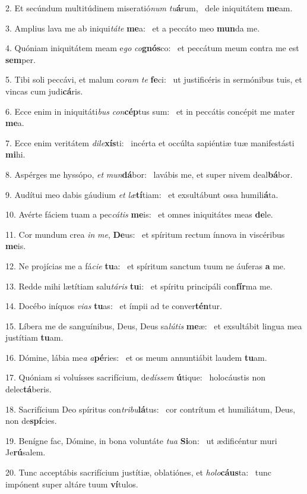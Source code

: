 2. Et secúndum multitúdinem miseratió\textit{num} \textit{tu}\textbf{á}rum, \ast\  dele iniquitátem \textbf{me}am.\

3. Amplius lava me ab iniqui\textit{tá}\textit{te} \textbf{me}a: \ast\  et a peccáto meo \textbf{mun}da me.\

4. Quóniam iniquitátem meam e\textit{go} \textit{co}\textbf{gnós}co: \ast\  et peccátum meum contra me est \textbf{sem}per.\

5. Tibi soli peccávi, et malum co\textit{ram} \textit{te} \textbf{fe}ci: \ast\  ut justificéris in sermónibus tuis, et vincas cum judi\textbf{cá}ris.\

6. Ecce enim in iniquitáti\textit{bus} \textit{con}\textbf{cép}tus sum: \ast\  et in peccátis concépit me mater \textbf{me}a.\

7. Ecce enim veritátem \textit{di}\textit{le}\textbf{xís}ti: \ast\  incérta et occúlta sapiéntiæ tuæ manifestásti \textbf{mi}hi.\

8. Aspérges me hyssópo, \textit{et} \textit{mun}\textbf{dá}bor: \ast\  lavábis me, et super nivem deal\textbf{bá}bor.\

9. Audítui meo dabis gáudium \textit{et} \textit{læ}\textbf{tí}tiam: \ast\  et exsultábunt ossa humili\textbf{á}ta.\

10. Avérte fáciem tuam a pec\textit{cá}\textit{tis} \textbf{me}is: \ast\  et omnes iniquitátes meas \textbf{de}le.\

11. Cor mundum crea \textit{in} \textit{me}, \textbf{De}us: \ast\  et spíritum rectum ínnova in viscéribus \textbf{me}is.\

12. Ne projícias me a fá\textit{ci}\textit{e} \textbf{tu}a: \ast\  et spíritum sanctum tuum ne áuferas \textbf{a} me.\

13. Redde mihi lætítiam salu\textit{tá}\textit{ris} \textbf{tu}i: \ast\  et spíritu principáli con\textbf{fír}ma me.\

14. Docébo iníquos \textit{vi}\textit{as} \textbf{tu}as: \ast\  et ímpii ad te conver\textbf{tén}tur.\

15. Líbera me de sanguínibus, Deus, Deus sa\textit{lú}\textit{tis} \textbf{me}æ: \ast\  et exsultábit lingua mea justítiam \textbf{tu}am.\

16. Dómine, lábia me\textit{a} \textit{a}\textbf{pé}ries: \ast\  et os meum annuntiábit laudem \textbf{tu}am.\

17. Quóniam si voluísses sacrifícium, de\textit{dís}\textit{sem} \textbf{ú}tique: \ast\  holocáustis non delec\textbf{tá}beris.\

18. Sacrifícium Deo spíritus con\textit{tri}\textit{bu}\textbf{lá}tus: \ast\  cor contrítum et humiliátum, Deus, non de\textbf{spí}cies.\

19. Benígne fac, Dómine, in bona voluntáte \textit{tu}\textit{a} \textbf{Si}on: \ast\  ut ædificéntur muri Je\textbf{rú}salem.\

20. Tunc acceptábis sacrifícium justítiæ, oblatiónes, et \textit{ho}\textit{lo}\textbf{cáus}ta: \ast\  tunc impónent super altáre tuum \textbf{ví}tulos.\

